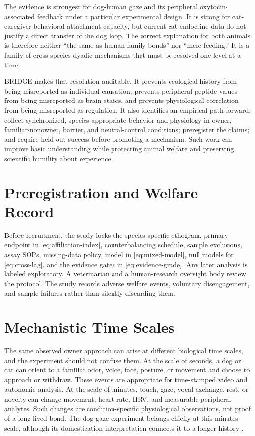 \documentclass[conference]{IEEEtran}
\begin{document}
The evidence is strongest for dog-human gaze and its peripheral oxytocin-associated feedback under a particular experimental design. It is strong for cat-caregiver behavioral attachment capacity, but current cat endocrine data do not justify a direct transfer of the dog loop. The correct explanation for both animals is therefore neither ``the same as human family bonds'' nor ``mere feeding.'' It is a family of cross-species dyadic mechanisms that must be resolved one level at a time.

BRIDGE makes that resolution auditable. It prevents ecological history from being misreported as individual causation, prevents peripheral peptide values from being misreported as brain states, and prevents physiological correlation from being misreported as regulation. It also identifies an empirical path forward: collect synchronized, species-appropriate behavior and physiology in owner, familiar-nonowner, barrier, and neutral-control conditions; preregister the claims; and require held-out success before promoting a mechanism. Such work can improve basic understanding while protecting animal welfare and preserving scientific humility about experience.

\appendices
\section{Preregistration and Welfare Record}

Before recruitment, the study locks the species-specific ethogram, primary endpoint in \eqref{eq:affiliation-index}, counterbalancing schedule, sample exclusions, assay SOPs, missing-data policy, model in \eqref{eq:mixed-model}, null models for \eqref{eq:cross-lag}, and the evidence gates in \eqref{eq:evidence-grade}. Any later analysis is labeled exploratory. A veterinarian and a human-research oversight body review the protocol. The study records adverse welfare events, voluntary disengagement, and sample failures rather than silently discarding them.

\section{Mechanistic Time Scales}

The same observed owner approach can arise at different biological time scales, and the experiment should not confuse them. At the scale of seconds, a dog or cat can orient to a familiar odor, voice, face, posture, or movement and choose to approach or withdraw. These events are appropriate for time-stamped video and autonomic analysis. At the scale of minutes, touch, gaze, vocal exchange, rest, or novelty can change movement, heart rate, HRV, and measurable peripheral analytes. Such changes are condition-specific physiological observations, not proof of a long-lived bond. The dog gaze experiment belongs chiefly at this minutes scale, although its domestication interpretation connects it to a longer history \cite{nagasawa2015}.
\end{document}
